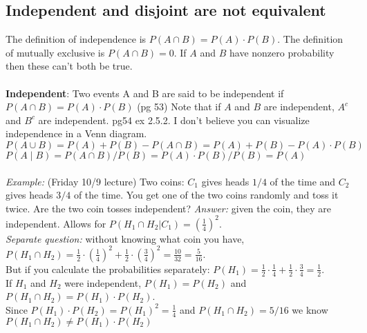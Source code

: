 	

\subsection{Independent and disjoint are not equivalent}
The definition of independence is $P(A \cap B) = P(A) \cdot P(B)$.  The definition of mutually exclusive is $P(A \cap B) = 0$.   If $A$ and $B$ have nonzero probability then these can't both be true.  \hfill \\
\hfill \\

\textbf{Independent}: Two events A and B are said to be independent if $P(A \cap B) = P(A) \cdot P(B)$ {\tiny (pg 53)} Note that if $A$ and $B$ are independent, $A^c$ and $B^c$ are independent. {\tiny pg54 ex 2.5.2.}  I don't believe you can visualize independence in a Venn diagram. \hfill \\ 
$P(A \cup B) = P(A) + P(B) - P(A \cap B) = P(A) + P(B) - P(A) \cdot P(B)$ \hfill \\
$P(A \mid B) = P(A \cap B)/P(B) = P(A) \cdot P(B)/P(B) = P(A)$ \hfill \\
 \hfill \\ 
 
 \textit{Example:} {\tiny (Friday 10/9 lecture)} Two coins: $C_1$ gives heads $1/4$ of the time and $C_2$ gives heads $3/4$ of the time.  You get one of the two coins randomly and toss it twice.  Are the two coin tosses independent?  \textit{Answer:} given the coin, they are independent.  Allows for $P(H_1 \cap H_2 | C_1) =  \left(\frac{1}{4}\right)^2$.    \hfill \\
 \textit{Separate question: } without knowing what coin you have, $P(H_1 \cap H_2) = \frac{1}{2}  \cdot  \left(\frac{1}{4}\right)^2 + \frac{1}{2}  \cdot  \left(\frac{3}{4}\right)^2 = \frac{10}{32} =\frac{5}{16} $.   \hfill \\
 But if you calculate the probabilities separately: $P(H_1) = \frac{1}{2}\cdot \frac{1}{4} + \frac{1}{2}\cdot \frac{3}{4} = \frac{1}{2} $.   \hfill \\
 If $H_1$ and $H_2$ were independent, $P(H_1) = P(H_2)$ and $P(H_1 \cap H_2) = P(H_1) \cdot P(H_2)$.    \hfill \\
 Since $P(H_1) \cdot P(H_2) = P(H_1)^2 = \frac{1}{4}$ and $P(H_1 \cap H_2) = 5/16$ we know  $P(H_1 \cap H_2) \neq P(H_1)\cdot P(H_2) $


